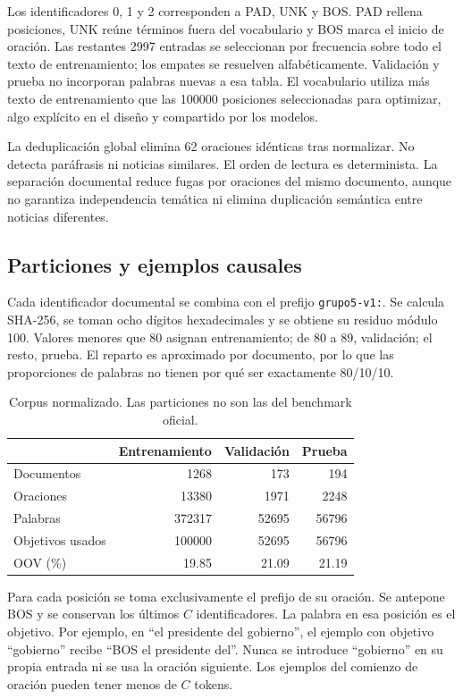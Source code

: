 Los identificadores 0, 1 y 2 corresponden a PAD, UNK y BOS.
PAD rellena posiciones, UNK reúne términos fuera del vocabulario y BOS
marca el inicio de oración. Las restantes 2997 entradas se seleccionan
por frecuencia sobre todo el texto de entrenamiento; los empates se
resuelven alfabéticamente. Validación y prueba no incorporan palabras
nuevas a esa tabla. El vocabulario utiliza más texto de entrenamiento que
las 100000 posiciones seleccionadas para optimizar, algo explícito en
el diseño y compartido por los modelos.

La deduplicación global elimina 62 oraciones idénticas tras normalizar.
No detecta paráfrasis ni noticias similares. El orden de lectura es
determinista. La separación documental reduce fugas por oraciones del
mismo documento, aunque no garantiza independencia temática ni elimina
duplicación semántica entre noticias diferentes.

\subsection{Particiones y ejemplos causales}
Cada identificador documental se combina con el prefijo
\texttt{grupo5-v1:}. Se calcula SHA-256, se toman ocho dígitos
hexadecimales y se obtiene su residuo módulo 100. Valores menores que
80 asignan entrenamiento; de 80 a 89, validación; el resto, prueba.
El reparto es aproximado por documento, por lo que las proporciones
de palabras no tienen por qué ser exactamente 80/10/10.

\begin{table}[tb]
\caption{Corpus normalizado. Las particiones no son las del benchmark oficial.}
\label{tab:datos}
\centering
\setlength{\tabcolsep}{3pt}
\begin{tabular}{lrrr}
\toprule
 & Entrenamiento & Validación & Prueba\\
\midrule
Documentos & 1268 & 173 & 194\\
Oraciones & 13380 & 1971 & 2248\\
Palabras & 372317 & 52695 & 56796\\
Objetivos usados & 100000 & 52695 & 56796\\
OOV (\%) & 19.85 & 21.09 & 21.19\\
\bottomrule
\end{tabular}
\end{table}

Para cada posición se toma exclusivamente el prefijo de su oración.
Se antepone BOS y se conservan los últimos $C$ identificadores.
La palabra en esa posición es el objetivo. Por ejemplo, en ``el
presidente del gobierno'', el ejemplo con objetivo ``gobierno'' recibe
``BOS el presidente del''. Nunca se introduce ``gobierno'' en su propia
entrada ni se usa la oración siguiente. Los ejemplos del comienzo de
oración pueden tener menos de $C$ tokens.

